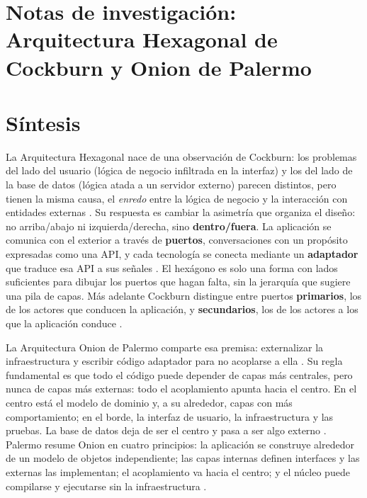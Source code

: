 
\section*{Notas de investigación: Arquitectura Hexagonal de Cockburn y Onion de Palermo}

\section{Síntesis}

La Arquitectura Hexagonal nace de una observación de Cockburn: los problemas del lado del usuario (lógica de negocio infiltrada en la interfaz) y los del lado de la base de datos (lógica atada a un servidor externo) parecen distintos, pero tienen la misma causa, el \emph{enredo} entre la lógica de negocio y la interacción con entidades externas \citep[«Motivation»; «Nature of the Solution»]{cockburn2005}. Su respuesta es cambiar la asimetría que organiza el diseño: no arriba/abajo ni izquierda/derecha, sino \textbf{dentro/fuera}. La aplicación se comunica con el exterior a través de \textbf{puertos}, conversaciones con un propósito expresadas como una API, y cada tecnología se conecta mediante un \textbf{adaptador} que traduce esa API a sus señales \citep[«Nature of the Solution»]{cockburn2005}. El hexágono es solo una forma con lados suficientes para dibujar los puertos que hagan falta, sin la jerarquía que sugiere una pila de capas. Más adelante Cockburn distingue entre puertos \textbf{primarios}, los de los actores que conducen la aplicación, y \textbf{secundarios}, los de los actores a los que la aplicación conduce \citep[«The Left-Right Asymmetry»]{cockburn2005}.

La Arquitectura Onion de Palermo comparte esa premisa: externalizar la infraestructura y escribir código adaptador para no acoplarse a ella \citep{palermo2008}. Su regla fundamental es que todo el código puede depender de capas más centrales, pero nunca de capas más externas: todo el acoplamiento apunta hacia el centro. En el centro está el modelo de dominio y, a su alrededor, capas con más comportamiento; en el borde, la interfaz de usuario, la infraestructura y las pruebas. La base de datos deja de ser el centro y pasa a ser algo externo \citep{palermo2008}. Palermo resume Onion en cuatro principios: la aplicación se construye alrededor de un modelo de objetos independiente; las capas internas definen interfaces y las externas las implementan; el acoplamiento va hacia el centro; y el núcleo puede compilarse y ejecutarse sin la infraestructura \citep{palermo2008c}.

